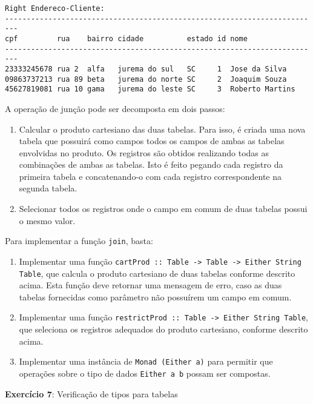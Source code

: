 \documentclass[11pt,a4paper]{report}
\begin{document}
\begin{verbatim}
Right Endereco-Cliente:
-------------------------------------------------------------------------
cpf         rua    bairro cidade          estado id nome            
-------------------------------------------------------------------------
23333245678 rua 2  alfa   jurema do sul   SC     1  Jose da Silva   
09863737213 rua 89 beta   jurema do norte SC     2  Joaquim Souza   
45627819081 rua 10 gama   jurema do leste SC     3  Roberto Martins 
\end{verbatim}
A opera\c{c}\~ao de jun\c{c}\~ao pode ser decomposta em dois passos:
\begin{enumerate}
	\item Calcular o produto cartesiano das duas tabelas. Para isso, \'e criada uma nova tabela que possuir\'a como
	      campos todos os campos de ambas as tabelas envolvidas no produto. Os registros s\~ao obtidos realizando
	      todas as combina\c{c}\~oes de ambas as tabelas. Isto \'e feito pegando cada registro da primeira tabela e 
	      concatenando-o com cada registro correspondente na segunda tabela.
	\item Selecionar todos os registros onde o campo em comum de duas tabelas possui o mesmo valor.
\end{enumerate}
Para implementar a fun\c{c}\~ao \texttt{join}, basta:
\begin{enumerate}
	\item Implementar uma fun\c{c}\~ao \texttt{cartProd :: Table -> Table -> Either String Table}, que calcula o produto
	      cartesiano de duas tabelas conforme descrito acima. Esta fun\c{c}\~ao deve retornar uma mensagem de erro,
	      caso as duas tabelas fornecidas como par\^ametro n\~ao possu\'irem um campo em comum.
	\item Implementar uma fun\c{c}\~ao \texttt{restrictProd :: Table -> Either String Table}, que seleciona os registros
	      adequados do produto cartesiano, conforme descrito acima.
	\item Implementar uma inst\^ancia de \texttt{Monad (Either a)} para permitir que opera\c{c}\~oes sobre o tipo de 
	      dados \texttt{Either a b} possam ser compostas.
\end{enumerate}
\textbf{Exerc\'icio 7}: Verifica\c{c}\~ao de tipos para tabelas
\end{document}

